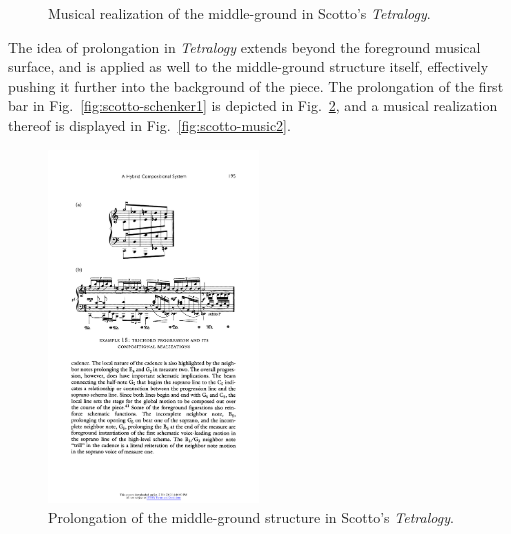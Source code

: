 \begin{example}
\begin{figure}[H]
		\caption[Musical realization of the middle-ground in Scotto's \emph{Tetralogy}]{Musical realization of the middle-ground in Scotto's \emph{Tetralogy}.}
    	\label{fig:scotto-music1}
	\end{figure}
	\noindent The idea of prolongation in \emph{Tetralogy} extends beyond the foreground musical surface, and is applied as well to the middle-ground structure itself, effectively pushing it further into the background of the piece. The prolongation of the first bar in Fig.~\ref{fig:scotto-schenker1} is depicted in Fig.~\ref{fig:scotto-schenker2}, and a musical realization thereof is displayed in Fig.~\ref{fig:scotto-music2}. 
	\begin{figure}[H]
    	\centering
    	\includegraphics[width=2.2in]{figures/scotto-schenker2.pdf}
    	\caption[Prolongation of the middle-ground structure in Scotto's \emph{Tetralogy}]{Prolongation of the middle-ground structure in Scotto's \emph{Tetralogy}.}
    	\label{fig:scotto-schenker2}
	\end{figure}
	\begin{figure}[H]
    	\centering

\end{figure}
\end{example}
